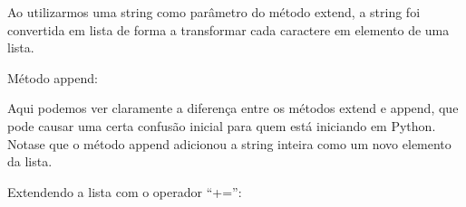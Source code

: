 \documentclass[letterpaper,10pt,brazil]{sphinxmanual}
\begin{document}
\begin{sphinxVerbatim}[commandchars=\\\{\}]
\end{sphinxVerbatim}

Ao utilizarmos uma string como parâmetro do método extend, a string foi
convertida em lista de forma a transformar cada caractere em elemento
de uma lista.

Método append:

\begin{sphinxVerbatim}[commandchars=\\\{\}]
\end{sphinxVerbatim}

\begin{sphinxVerbatim}[commandchars=\\\{\}]
\end{sphinxVerbatim}

Aqui podemos ver claramente a diferença entre os métodos extend e append, que
pode causar uma certa confusão inicial para quem está iniciando em Python.
Nota\sphinxhyphen{}se que o método append adicionou a string inteira como um novo elemento
da lista.

Extendendo a lista com o operador “+=”:

\begin{sphinxVerbatim}[commandchars=\\\{\}]
  
\end{sphinxVerbatim}

\begin{sphinxVerbatim}[commandchars=\\\{\}]
\PYG{g+go}{[\PYGZsq{}a\PYGZsq{},}
\PYG{g+go}{\PYGZsq{}g\PYGZsq{}]}
\end{sphinxVerbatim}
\end{document}
